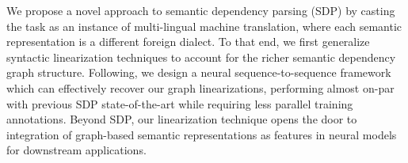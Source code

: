 We propose a novel approach to semantic dependency parsing (SDP) by casting the task as an instance of multi-lingual machine translation, where each semantic representation is a different foreign dialect. To that end, we first generalize syntactic linearization techniques to account for the richer semantic dependency graph structure. Following, we design a neural sequence-to-sequence framework which can effectively recover our graph linearizations, performing almost on-par with previous SDP state-of-the-art while requiring less parallel training annotations. Beyond SDP, our linearization technique opens the door to integration of graph-based semantic representations as features in neural models for downstream applications.
